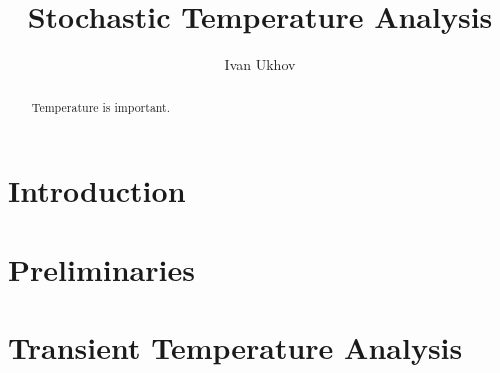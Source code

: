 \documentclass[conference]{IEEEtran}
\begin{document}
  \title{Stochastic Temperature Analysis}
  \author{Ivan Ukhov}

  \maketitle

  \begin{abstract}
    Temperature is important.
  \end{abstract}

  \section{Introduction}  
  

  \section{Preliminaries}
  

  \section{Transient Temperature Analysis} 
  

  
  
\end{document}
